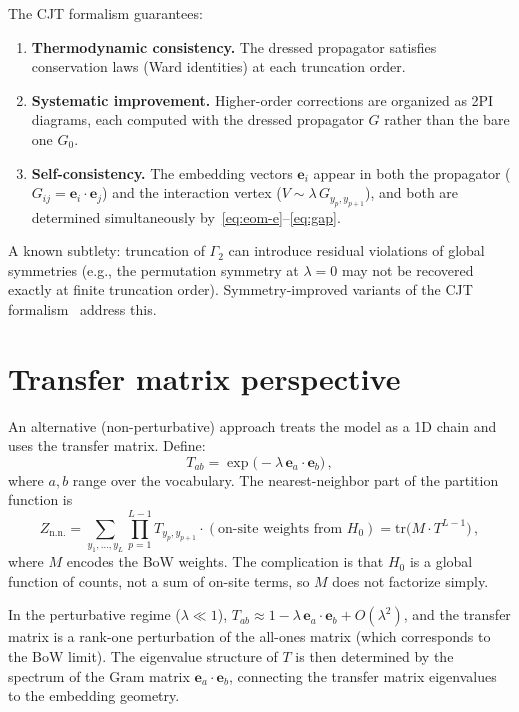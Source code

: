\documentclass[11pt]{article}
\newcommand{\ee}{\bm{e}}
\begin{document}
The CJT formalism guarantees:
\begin{enumerate}
    \item \textbf{Thermodynamic consistency.} The dressed propagator satisfies conservation laws (Ward identities) at each truncation order.
    \item \textbf{Systematic improvement.} Higher-order corrections are organized as 2PI diagrams, each computed with the dressed propagator $G$ rather than the bare one $G_0$.
    \item \textbf{Self-consistency.} The embedding vectors $\ee_i$ appear in both the propagator ($G_{ij} = \ee_i \cdot \ee_j$) and the interaction vertex ($V \sim \lambda\, G_{y_p, y_{p+1}}$), and both are determined simultaneously by~\eqref{eq:eom-e}--\eqref{eq:gap}.
\end{enumerate}

A known subtlety: truncation of $\Gamma_2$ can introduce residual violations of global symmetries (e.g., the permutation symmetry at $\lambda = 0$ may not be recovered exactly at finite truncation order). Symmetry-improved variants of the CJT formalism~\cite{pilaftsis2013} address this.

\section{Transfer matrix perspective}\label{sec:transfer}

An alternative (non-perturbative) approach treats the model as a 1D chain and uses the transfer matrix. Define:
\begin{equation}\label{eq:transfer}
    T_{ab} = \exp\!\big(-\lambda\, \ee_a \cdot \ee_b\big)\,,
\end{equation}
where $a, b$ range over the vocabulary. The nearest-neighbor part of the partition function is
\begin{equation}\label{eq:Z-transfer}
    Z_{\text{n.n.}} = \sum_{y_1, \ldots, y_L} \prod_{p=1}^{L-1} T_{y_p, y_{p+1}} \cdot (\text{on-site weights from } H_0) = \mathrm{tr}\big(M \cdot T^{L-1}\big)\,,
\end{equation}
where $M$ encodes the BoW weights. The complication is that $H_0$ is a global function of counts, not a sum of on-site terms, so $M$ does not factorize simply.

In the perturbative regime ($\lambda \ll 1$), $T_{ab} \approx 1 - \lambda\, \ee_a \cdot \ee_b + O(\lambda^2)$, and the transfer matrix is a rank-one perturbation of the all-ones matrix (which corresponds to the BoW limit). The eigenvalue structure of $T$ is then determined by the spectrum of the Gram matrix $\ee_a \cdot \ee_b$, connecting the transfer matrix eigenvalues to the embedding geometry.
\end{document}

